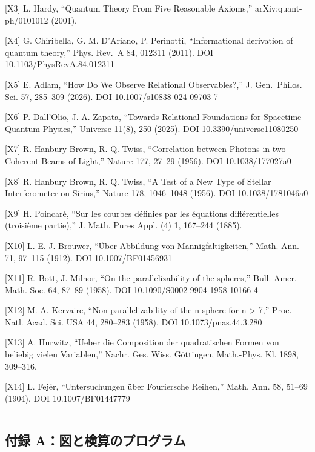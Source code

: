 \documentclass[
  a4paper,
]{ltjsarticle}
\begin{document}
{[}X3{]} L. Hardy, ``Quantum Theory From Five Reasonable Axioms,''
arXiv:quant-ph/0101012 (2001).

{[}X4{]} G. Chiribella, G. M. D'Ariano, P. Perinotti, ``Informational
derivation of quantum theory,'' Phys. Rev.~A 84, 012311 (2011). DOI
10.1103/PhysRevA.84.012311

{[}X5{]} E. Adlam, ``How Do We Observe Relational Observables?,'' J.
Gen.~Philos. Sci. 57, 285--309 (2026). DOI 10.1007/s10838-024-09703-7

{[}X6{]} P. Dall'Olio, J. A. Zapata, ``Towards Relational Foundations
for Spacetime Quantum Physics,'' Universe 11(8), 250 (2025). DOI
10.3390/universe11080250

{[}X7{]} R. Hanbury Brown, R. Q. Twiss, ``Correlation between Photons in
two Coherent Beams of Light,'' Nature 177, 27--29 (1956). DOI
10.1038/177027a0

{[}X8{]} R. Hanbury Brown, R. Q. Twiss, ``A Test of a New Type of
Stellar Interferometer on Sirius,'' Nature 178, 1046--1048 (1956). DOI
10.1038/1781046a0

{[}X9{]} H. Poincaré, ``Sur les courbes définies par les équations
différentielles (troisième partie),'' J. Math. Pures Appl. (4) 1,
167--244 (1885).

{[}X10{]} L. E. J. Brouwer, ``Über Abbildung von Mannigfaltigkeiten,''
Math. Ann. 71, 97--115 (1912). DOI 10.1007/BF01456931

{[}X11{]} R. Bott, J. Milnor, ``On the parallelizability of the
spheres,'' Bull. Amer. Math. Soc. 64, 87--89 (1958). DOI
10.1090/S0002-9904-1958-10166-4

{[}X12{]} M. A. Kervaire, ``Non-parallelizability of the n-sphere for n
\textgreater{} 7,'' Proc. Natl. Acad. Sci. USA 44, 280--283 (1958). DOI
10.1073/pnas.44.3.280

{[}X13{]} A. Hurwitz, ``Ueber die Composition der quadratischen Formen
von beliebig vielen Variablen,'' Nachr. Ges. Wiss. Göttingen,
Math.-Phys. Kl. 1898, 309--316.

{[}X14{]} L. Fejér, ``Untersuchungen über Fouriersche Reihen,'' Math.
Ann. 58, 51--69 (1904). DOI 10.1007/BF01447779

\begin{center}\rule{0.5\linewidth}{0.5pt}\end{center}

\subsection{付録
A：図と検算のプログラム}\label{ux4ed8ux9332-aux56f3ux3068ux691cux7b97ux306eux30d7ux30edux30b0ux30e9ux30e0}
\end{document}
